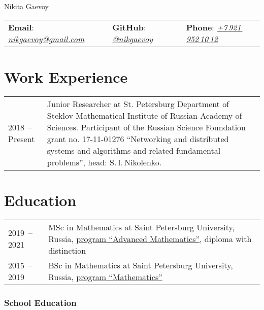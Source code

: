 \documentclass[a4paper, 11pt]{article}
\begin{document}


\begin{center}
    {\Huge Nikita Gaevoy}
\end{center}

\begin{center}
    \begin{tabular}{lll}
        \textbf{Email}: \href{mailto:nikgaevoy@gmail.com}{{\it nikgaevoy@gmail.com}} &
        \hspace{0.13cm} \textbf{GitHub}: \href{https://github.com/nikgaevoy}{{\it @nikgaevoy}} &
        \hspace{0.13cm} \textbf{Phone}: \href{tel:+79219521012}{{\it +7\,921\,952\,10\,12}}
    \end{tabular}
\end{center}

\section*{Work Experience}

\begin{tabularx}{\textwidth}{lX}
    2018~-- Present & Junior Researcher at St. Petersburg Department of Steklov Mathematical Institute of Russian Academy of Sciences. Participant of the Russian Science Foundation grant no. 17-11-01276 ``Networking and distributed systems and algorithms and related fundamental problems'', head: S.\,I.\,Nikolenko.
    \\
\end{tabularx}


\section*{Education}

\begin{tabularx}{\textwidth}{lX}
    2019~-- 2021 & MSc in Mathematics at Saint Petersburg University, Russia, \href{https://math-cs.spbu.ru/en/msc-math-en/}{program ``Advanced Mathematics''}, diploma with distinction \\
    2015~-- 2019 & BSc in Mathematics at Saint Petersburg University, Russia, \href{https://math-cs.spbu.ru/en/}{program ``Mathematics''} 
\end{tabularx}

\subsubsection*{School Education}
\end{document}
